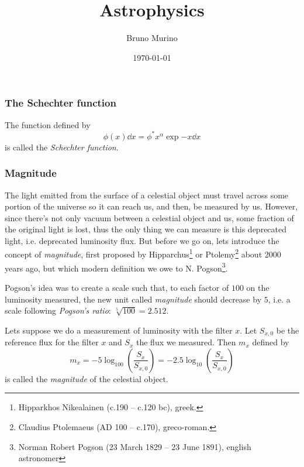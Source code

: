 \documentclass{_mypackages/monograph}
\title{Astrophysics} %
\author{Bruno Murino} %
\date{\today} %
\begin{document}
\frontmatter

\monographtp
\dominitoc
\doparttoc
\pagestyle{onlypagenum}
\tableofcontents
\mainmatter


\subsubsection{The Schechter function}

The function defined by
\begin{equation}
    \phi(x)\dd{x} = \phi^* x^\alpha \exp{-x}\dd{x}
\end{equation}
is called the \emph{Schechter function}.


\subsubsection{Magnitude}

The light emitted from the surface of a celestial object must travel across some portion of the universe so it can reach us, and then, be measured by us. However, since there's not only vacuum between a celestial object and us, some fraction of the original light is lost, thus the only thing we can measure is this deprecated light, i.e. deprecated luminosity flux. But before we go on, lets introduce the concept of \emph{magnitude}, first proposed by Hipparchus\footnote{Hipparkhos Nikealainen (c.190 – c.120 bc), greek.} or Ptolemy\footnote{Claudius Ptolemaeus (AD 100 – c.170), greco-roman.} about 2000 years ago, but which modern definition we owe to N. Pogson\footnote{Norman Robert Pogson (23 March 1829 – 23 June 1891), english astronomer}. 

Pogson's idea was to create a scale such that, to each factor of \(100\) on the luminosity measured, the new unit called \emph{magnitude} should decrease by \(5\), i.e. a scale following \emph{Pogson's ratio}: \(\sqrt[5]{100} = 2.512\).

\begin{definition}[Magnitude]
Lets suppose we do a measurement of luminosity with the filter \(x\). Let \(S_{x,0}\) be the reference flux for the filter \(x\) and \(S_x\) the flux we measured. Then \(m_x\) defined by
\begin{equation}
    m_x = - 5 \log_{100}\left(\frac{S_x}{S_{x,0}} \right) = - 2.5 \log_{10}\left(\frac{S_x}{S_{x,0}} \right)
\end{equation}
is called the \emph{magnitude} of the celestial object.
\end{definition}
\end{document}

